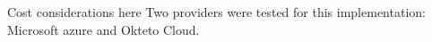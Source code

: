 {\color{red}Cost considerations here}
Two providers were tested for this implementation: Microsoft azure and Okteto Cloud.